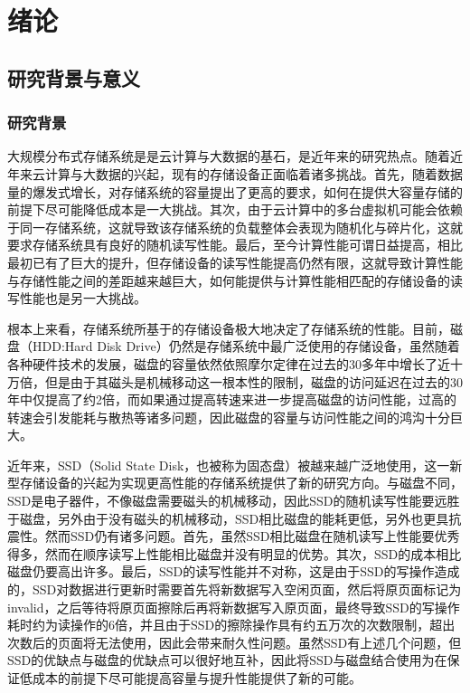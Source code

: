 
\chapter{绪论}
\label{chap:intro}

\section{研究背景与意义}

\subsection{研究背景}
\label{sec:backgrounds}

大规模分布式存储系统是是云计算与大数据的基石，是近年来的研究热点。随着近年来云计算与大数据的兴起，现有的存储设备正面临着诸多挑战。首先，随着数据量的爆发式增长，对存储系统的容量提出了更高的要求，如何在提供大容量存储的前提下尽可能降低成本是一大挑战\cite{gray2003next}。其次，由于云计算中的多台虚拟机可能会依赖于同一存储系统，这就导致该存储系统的负载整体会表现为随机化与碎片化，这就要求存储系统具有良好的随机读写性能。最后，至今计算性能可谓日益提高，相比最初已有了巨大的提升，但存储设备的读写性能提高仍然有限，这就导致计算性能与存储性能之间的差距越来越巨大\cite{morris2003evolution}，如何能提供与计算性能相匹配的存储设备的读写性能也是另一大挑战。

根本上来看，存储系统所基于的存储设备极大地决定了存储系统的性能。目前，磁盘（HDD:Hard Disk Drive）仍然是存储系统中最广泛使用的存储设备，虽然随着各种硬件技术的发展，磁盘的容量依然依照摩尔定律\cite{schirle1996history}在过去的30多年中增长了近十万倍，但是由于其磁头是机械移动这一根本性的限制，磁盘的访问延迟在过去的30年中仅提高了约2倍，而如果通过提高转速来进一步提高磁盘的访问性能，过高的转速会引发能耗与散热等诸多问题，因此磁盘的容量与访问性能之间的鸿沟十分巨大。

近年来，SSD（Solid State Disk，也被称为固态盘）被越来越广泛地使用，这一新型存储设备的兴起为实现更高性能的存储系统提供了新的研究方向。与磁盘不同，SSD是电子器件，不像磁盘需要磁头的机械移动，因此SSD的随机读写性能要远胜于磁盘，另外由于没有磁头的机械移动，SSD相比磁盘的能耗更低，另外也更具抗震性。然而SSD仍有诸多问题。首先，虽然SSD相比磁盘在随机读写上性能要优秀得多，然而在顺序读写上性能相比磁盘并没有明显的优势。其次，SSD的成本相比磁盘仍要高出许多。最后，SSD的读写性能并不对称，这是由于SSD的写操作造成的，SSD对数据进行更新时需要首先将新数据写入空闲页面，然后将原页面标记为invalid，之后等待将原页面擦除后再将新数据写入原页面，最终导致SSD的写操作耗时约为读操作的6倍，并且由于SSD的擦除操作具有约五万次的次数限制，超出次数后的页面将无法使用，因此会带来耐久性问题。虽然SSD有上述几个问题，但SSD的优缺点与磁盘的优缺点可以很好地互补，因此将SSD与磁盘结合使用为在保证低成本的前提下尽可能提高容量与提升性能提供了新的可能。

